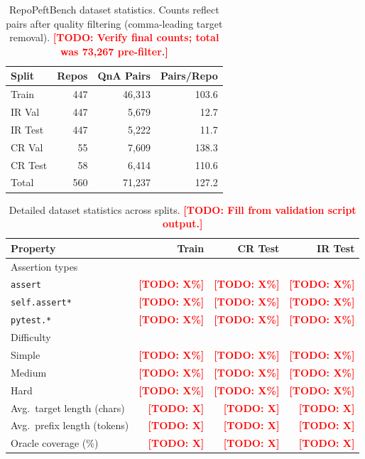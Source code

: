 \documentclass[11pt]{article}
\newcommand{\benchmark}{RepoPeftBench}
\newcommand{\todo}[1]{\textcolor{red}{\textbf{[TODO: #1]}}}
\begin{document}
\begin{table}[t]
\centering
\small
\begin{tabular}{lrrr}
\toprule
Split & Repos & QnA Pairs & Pairs/Repo \\
\midrule
Train & 447 & 46,313 & 103.6 \\
IR Val & 447 & 5,679 & 12.7 \\
IR Test & 447 & 5,222 & 11.7 \\
CR Val & 55 & 7,609 & 138.3 \\
CR Test & 58 & 6,414 & 110.6 \\
\midrule
Total & 560 & 71,237 & 127.2 \\
\bottomrule
\end{tabular}
\caption{\benchmark{} dataset statistics. Counts reflect pairs after quality filtering (comma-leading target removal). \todo{Verify final counts; total was 73,267 pre-filter.}}
\label{tab:dataset_stats}
\end{table}

\begin{table}[t]
\centering
\small
\begin{tabular}{lrrr}
\toprule
Property & Train & CR Test & IR Test \\
\midrule
Assertion types & & & \\
\quad \texttt{assert} & \todo{X\%} & \todo{X\%} & \todo{X\%} \\
\quad \texttt{self.assert*} & \todo{X\%} & \todo{X\%} & \todo{X\%} \\
\quad \texttt{pytest.*} & \todo{X\%} & \todo{X\%} & \todo{X\%} \\
\midrule
Difficulty & & & \\
\quad Simple & \todo{X\%} & \todo{X\%} & \todo{X\%} \\
\quad Medium & \todo{X\%} & \todo{X\%} & \todo{X\%} \\
\quad Hard & \todo{X\%} & \todo{X\%} & \todo{X\%} \\
\midrule
Avg.\ target length (chars) & \todo{X} & \todo{X} & \todo{X} \\
Avg.\ prefix length (tokens) & \todo{X} & \todo{X} & \todo{X} \\
Oracle coverage (\%) & \todo{X} & \todo{X} & \todo{X} \\
\bottomrule
\end{tabular}
\caption{Detailed dataset statistics across splits. \todo{Fill from validation script output.}}
\label{tab:dataset_details}
\end{table}
\end{document}
